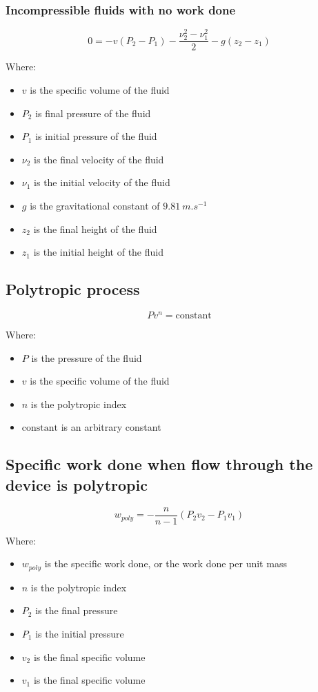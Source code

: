 \documentclass[11pt]{article}
\begin{document}
\subsubsection{Incompressible fluids with no work done}
\label{sec:org2190dc3}
\[0 = -v (P_2 - P_1) - \frac{\nu_2^2 - \nu_1^2}{2} - g(z_2 - z_1)\]

Where:
\begin{itemize}
\item \(v\) is the specific volume of the fluid
\item \(P_2\) is final pressure of the fluid
\item \(P_1\) is initial pressure of the fluid
\item \(\nu_2\) is the final velocity of the fluid
\item \(\nu_1\) is the initial velocity of the fluid
\item \(g\) is the gravitational constant of \(\qty{9.81}{m.s^{-1}}\)
\item \(z_2\) is the final height of the fluid
\item \(z_1\) is the initial height of the fluid
\end{itemize}

\subsection{Polytropic process}
\label{sec:org6a29a5e}
\[Pv^n = \text{constant}\]

Where:
\begin{itemize}
\item \(P\) is the pressure of the fluid
\item \(v\) is the specific volume of the fluid
\item \(n\) is the polytropic index
\item \(\text{constant}\) is an arbitrary constant
\end{itemize}

\subsection{Specific work done when flow through the device is polytropic}
\label{sec:org7f3d71d}
\[w_{poly} = - \frac{n}{n - 1}(P_2 v_2 - P_1 v_1)\]

Where:
\begin{itemize}
\item \(w_{poly}\) is the specific work done, or the work done per unit mass
\item \(n\) is the polytropic index
\item \(P_2\) is the final pressure
\item \(P_1\) is the initial pressure
\item \(v_2\) is the final specific volume
\item \(v_1\) is the final specific volume
\end{itemize}
\end{document}
